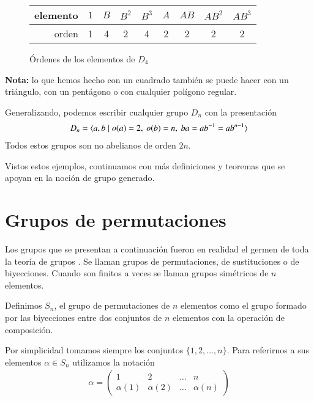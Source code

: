 \begin{ej}
	\begin{figure}[h]
		\centering
		\begin{tabular}{r|cccccccc}
			elemento & $1$ & $B$ & $B^2$ & $B^3$ & $A$ & $AB$ & $AB^2$ & $AB^3$ \\ \hline
			orden   &  1  &  4  &   2   &   4   &  2  &  2   &   2    &   2
		\end{tabular}
		\caption{Órdenes de los elementos de $D_4$}
	\end{figure}
	
	\textbf{Nota:} lo que hemos hecho con un cuadrado también se puede hacer con un triángulo, con un pentágono o con cualquier polígono regular.
\end{ej}

\begin{ej}
	\label{ej:diedricosordengenerico}
	Generalizando, podemos escribir cualquier grupo $D_n$ con la presentación
	\begin{align*}
		D_n = \langle a, b \mid o(a) = 2,\ o(b) = n,\ ba = ab^{-1} = ab^{n-1}\rangle
	\end{align*}
	Todos estos grupos son no abelianos de orden $2n$.
\end{ej}

Vistos estos ejemplos, continuamos con más definiciones y teoremas que se apoyan en la noción de grupo generado.

\section{Grupos de permutaciones}

Los grupos que se presentan a continuación fueron en realidad el germen de toda la teoría de grupos \cite{dor96}. Se llaman grupos de permutaciones, de sustituciones o de biyecciones. Cuando son finitos a veces se llaman grupos simétricos de $n$ elementos.

\begin{dfn}
	\label{dfn:sn}
	Definimos $S_n$, el grupo de permutaciones de $n$ elementos como el grupo formado por las biyecciones entre dos conjuntos de $n$ elementos con la operación de composición.
	
	Por simplicidad tomamos siempre los conjuntos $\{1, 2, \dots, n\}$. Para referirnos a sus elementos $\alpha \in S_n$ utilizamos la notación
	\begin{align*}
		\alpha = \left(\begin{array}{cccc}
		1 & 2 & \dots & n \\
		\alpha(1) & \alpha(2) & \dots & \alpha(n)
		\end{array}\right)
	\end{align*}
\end{dfn}

